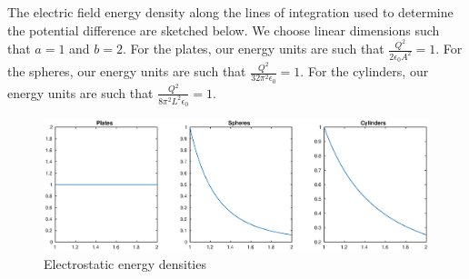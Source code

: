 \documentclass[a4paper,11pt]{article}
\numberwithin{equation}{section}
\newcommand{\ez}{\epsilon_0}
\begin{document}
The electric field energy density along the lines of integration used to determine the potential difference are sketched below.
We choose linear dimensions such that $a=1$ and $b=2$.
For the plates, our energy units are such that $\frac{Q^2}{2\ez A^2}=1$.
For the spheres, our energy units are such that $\frac{Q^2}{32\pi^2\ez}=1$.
For the cylinders, our energy units are such that $\frac{Q^2}{8\pi^2L^2\ez}=1$.
\begin{figure}[h]
 \caption{Electrostatic energy densities}
 \centering
   \includegraphics[width=\textwidth]{EnergyDensities}
\end{figure}
\end{document}

